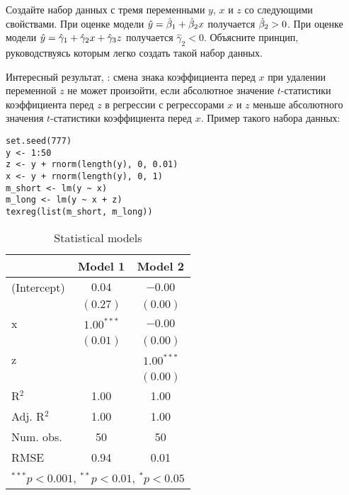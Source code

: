 \begin{problem} %
Создайте набор данных с тремя переменными $y$, $x$ и $z$ со следующими свойствами. При оценке модели $\hat{y}=\hat{\beta}_1+\hat{\beta}_2 x$ получается $\hat{\beta}_2>0$. При оценке модели $\hat{y}=\hat{\gamma}_1+ \hat{\gamma}_2 x+\hat{\gamma}_3 z$ получается $\hat{\gamma}_2<0$. Объясните принцип, руководствуясь которым легко создать такой набор данных.


\begin{sol}
  Интересный результат, \cite{leamer1975result}: смена знака коэффициента перед \(x\) при удалении переменной \(z\) не может произойти, если абсолютное значение \(t\)-статистики коэффициента перед \(z\) в регрессии с регрессорами \(x\) и \(z\) меньше абсолютного значения \(t\)-статистики коэффициента перед \(x\).
Пример такого набора данных:
\begin{verbatim}
set.seed(777)
y <- 1:50
z <- y + rnorm(length(y), 0, 0.01)
x <- y + rnorm(length(y), 0, 1)
m_short <- lm(y ~ x)
m_long <- lm(y ~ x + z)
texreg(list(m_short, m_long))
\end{verbatim}

\begin{table}
\begin{center}
\begin{tabular}{l c c }
\hline
 & Model 1 & Model 2 \\
\hline
(Intercept) & $0.04$       & $-0.00$      \\
            & $(0.27)$     & $(0.00)$     \\
x           & $1.00^{***}$ & $-0.00$      \\
            & $(0.01)$     & $(0.00)$     \\
z           &              & $1.00^{***}$ \\
            &              & $(0.00)$     \\
\hline
R$^2$       & 1.00         & 1.00         \\
Adj. R$^2$  & 1.00         & 1.00         \\
Num. obs.   & 50           & 50           \\
RMSE        & 0.94         & 0.01         \\
\hline
\multicolumn{3}{l}{\scriptsize{$^{***}p<0.001$, $^{**}p<0.01$, $^*p<0.05$}}
\end{tabular}
\caption{Statistical models}
\label{table:coefficients}
\end{center}
\end{table}


\end{sol}
\end{problem}



